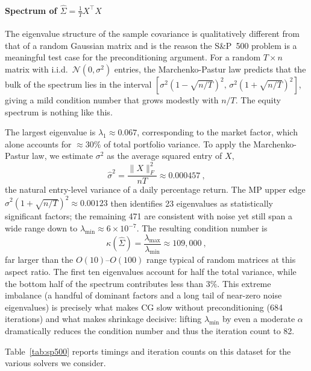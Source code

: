 \paragraph{Spectrum of $\hat\Sigma = \tfrac{1}{T}X^\top X$}
The eigenvalue structure of the sample covariance is qualitatively different from that of a random Gaussian matrix and
is the reason the S\&P~500 problem is a meaningful test case for the preconditioning argument. For a random $T \times n$
matrix with i.i.d.\ $\mathcal{N}(0,\sigma^2)$ entries, the Marchenko-Pastur law predicts that the bulk of the spectrum
lies in the interval $[\sigma^2(1-\sqrt{n/T})^2,\,\sigma^2(1+\sqrt{n/T})^2]$, giving a mild condition number that
grows modestly with $n/T$. The equity spectrum is nothing like this.

The largest eigenvalue is $\lambda_1 \approx 0.067$, corresponding to the market factor, which alone accounts for $\approx 30\%$ of
total portfolio variance. To apply the Marchenko-Pastur law, we estimate $\sigma^2$ as the average squared entry of $X$,
\[
  \hat\sigma^2 = \frac{\|X\|_F^2}{nT} \approx 0.000457~,
\]
the natural entry-level variance of a daily percentage return. The MP upper edge $\hat\sigma^2(1+\sqrt{n/T})^2 \approx 0.00123$
then identifies 23 eigenvalues as statistically significant factors; the remaining 471 are consistent with noise yet
still span a wide range down to $\lambda_{\min} \approx 6 \times 10^{-7}$. The resulting condition number is
\[
  \kappa(\hat\Sigma) = \frac{\lambda_{\max}}{\lambda_{\min}} \approx 109{,}000~,
\]
far larger than the $O(10)$--$O(100)$ range typical of random matrices at this aspect ratio. The first ten
eigenvalues account for half the total variance, while the bottom half of the spectrum contributes less than $3\%$.
This extreme imbalance (a handful of dominant factors and a long tail of near-zero noise eigenvalues) is precisely
what makes CG slow without preconditioning (684 iterations) and what makes shrinkage decisive: lifting
$\lambda_{\min}$ by even a moderate $\alpha$ dramatically reduces the condition number and thus the iteration count to 82.

Table~\ref{tab:sp500} reports timings and iteration counts on this dataset for the various solvers we consider.


